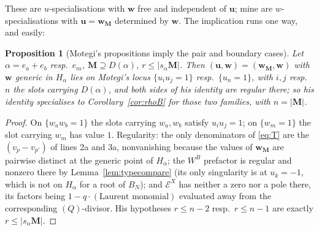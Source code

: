 \documentclass[11pt]{article}
\newtheorem{prop}[thm]{Proposition}
\theoremstyle{definition}
\newcommand{\bM}{\mathbf{M}}
\newcommand{\EX}{\mathcal{E}^{X}}
\begin{document}
\noindent
These are $u$-specialisations with $\mathbf w$ free and independent of $\mathbf
u$; mine are $w$-specialisations with $\mathbf u=\mathbf w_{\bM}$ determined by
$\mathbf w$.  The implication runs one way, and easily:

\begin{prop}[Motegi's propositions imply the pair and boundary cases]
\label{prop:specialise}
Let $\alpha=e_a+e_b$ resp.\ $e_m$, $\bM\supseteq D(\alpha)$,
$r\le|s_\alpha\bM|$.  Then $(\mathbf u,\mathbf w)=(\mathbf w_{\bM},\mathbf w)$
with $\mathbf w$ generic in $H_\alpha$ lies on Motegi's locus $\{u_iu_j=1\}$
resp.\ $\{u_n=1\}$, with $i,j$ resp.\ $n$ the slots carrying $D(\alpha)$, and
both sides of his identity are regular there; so his identity specialises to
Corollary~\ref{cor:rhoB} for those two families, with $n=|\bM|$.
\end{prop}

\begin{proof}
On $\{w_aw_b=1\}$ the slots carrying $w_a,w_b$ satisfy $u_iu_j=1$; on
$\{w_m=1\}$ the slot carrying $w_m$ has value $1$.  Regularity: the only
denominators of \eqref{eq:T} are the $(v_p-v_{p'})$ of lines 2a and 3a,
nonvanishing because the values of $\mathbf w_{\bM}$ are pairwise distinct at
the generic point of $H_\alpha$; the $W^{B}$ prefactor is regular and nonzero
there by Lemma~\ref{lem:typecompare} (its only singularity is at $u_k=-1$,
which is not on $H_\alpha$ for a root of $B_N$); and $\EX$ has neither a zero
nor a pole there, its factors being $1-q\cdot(\text{Laurent monomial})$
evaluated away from the corresponding $(Q)$-divisor.  His hypotheses $r\le n-2$
resp.\ $r\le n-1$ are exactly $r\le|s_\alpha\bM|$.
\end{proof}
\end{document}
